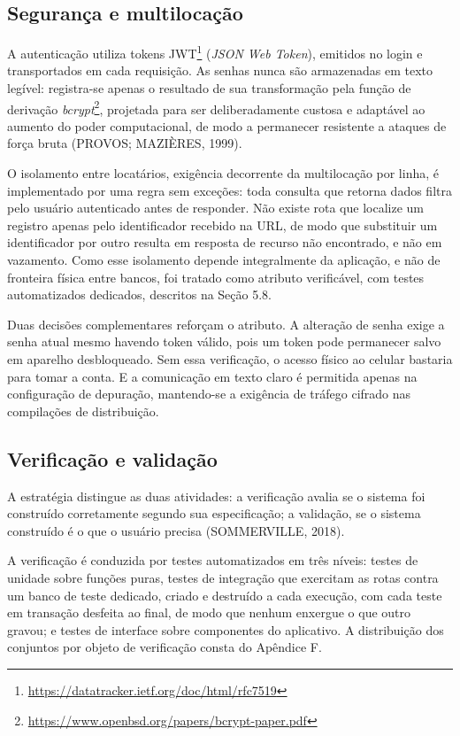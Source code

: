 \documentclass[12pt,oneside,a4paper,brazilian]{abntex2}
\begin{document}
\subsection{Segurança e multilocação}
A autenticação utiliza tokens JWT\footnote{\url{https://datatracker.ietf.org/doc/html/rfc7519}} (\textit{JSON Web Token}), emitidos no login e transportados em cada requisição. As senhas nunca são armazenadas em texto legível: registra-se apenas o resultado de sua transformação pela função de derivação \textit{bcrypt}\footnote{\url{https://www.openbsd.org/papers/bcrypt-paper.pdf}}, projetada para ser deliberadamente custosa e adaptável ao aumento do poder computacional, de modo a permanecer resistente a ataques de força bruta (PROVOS; MAZIÈRES, 1999).

O isolamento entre locatários, exigência decorrente da multilocação por linha, é implementado por uma regra sem exceções: toda consulta que retorna dados filtra pelo usuário autenticado antes de responder. Não existe rota que localize um registro apenas pelo identificador recebido na URL, de modo que substituir um identificador por outro resulta em resposta de recurso não encontrado, e não em vazamento. Como esse isolamento depende integralmente da aplicação, e não de fronteira física entre bancos, foi tratado como atributo verificável, com testes automatizados dedicados, descritos na Seção 5.8.

Duas decisões complementares reforçam o atributo. A alteração de senha exige a senha atual mesmo havendo token válido, pois um token pode permanecer salvo em aparelho desbloqueado. Sem essa verificação, o acesso físico ao celular bastaria para tomar a conta. E a comunicação em texto claro é permitida apenas na configuração de depuração, mantendo-se a exigência de tráfego cifrado nas compilações de distribuição.


\subsection{Verificação e validação}
A estratégia distingue as duas atividades: a verificação avalia se o sistema foi construído corretamente segundo sua especificação; a validação, se o sistema construído é o que o usuário precisa (SOMMERVILLE, 2018).

A verificação é conduzida por testes automatizados em três níveis: testes de unidade sobre funções puras, testes de integração que exercitam as rotas contra um banco de teste dedicado, criado e destruído a cada execução, com cada teste em transação desfeita ao final, de modo que nenhum enxergue o que outro gravou; e testes de interface sobre componentes do aplicativo. A distribuição dos conjuntos por objeto de verificação consta do Apêndice F.
\end{document}
